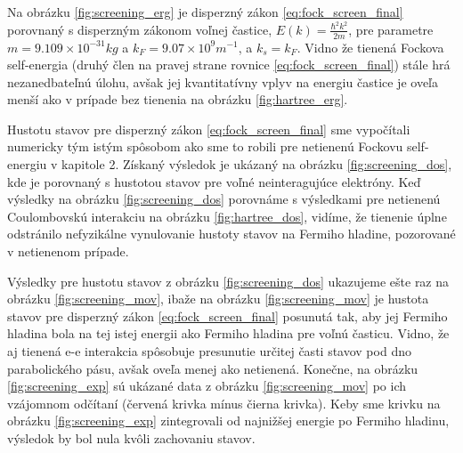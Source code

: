  Na obrázku \ref{fig:screening_erg} je disperzný zákon \eqref{eq:fock_screen_final} porovnaný s disperzným zákonom voľnej častice, $E(k)=\frac{\hbar^2 k^2}{2m}$, pre parametre $m = 9.109 \times 10^{-31} kg$ a $k_F = 9.07 \times 10^{9} m^{-1}$, a $k_s = k_F$. Vidno že tienená Fockova self-energia (druhý člen na pravej strane rovnice \ref{eq:fock_screen_final}) stále hrá nezanedbateľnú úlohu, avšak jej kvantitatívny vplyv na energiu častice je oveľa menší ako
 v prípade bez tienenia na obrázku \ref{fig:hartree_erg}.
 
 Hustotu stavov pre disperzný zákon \eqref{eq:fock_screen_final} sme vypočítali numericky tým istým spôsobom ako sme to robili pre netienenú Fockovu self-energiu v kapitole 2. Získaný výsledok je ukázaný na obrázku \ref{fig:screening_dos}, kde je porovnaný s hustotou stavov pre voľné neinteragujúce elektróny. Keď výsledky na obrázku \ref{fig:screening_dos} porovnáme s výsledkami pre netienenú Coulombovskú interakciu na obrázku  \ref{fig:hartree_dos}, vidíme, že tienenie úplne odstránilo nefyzikálne vynulovanie hustoty stavov na Fermiho hladine, pozorované v netienenom prípade. 
 

Výsledky pre hustotu stavov  z obrázku \ref{fig:screening_dos} ukazujeme ešte raz na obrázku \ref{fig:screening_mov}, ibaže na obrázku \ref{fig:screening_mov} je hustota stavov pre disperzný zákon \eqref{eq:fock_screen_final} posunutá tak, aby jej Fermiho hladina bola na tej istej energii ako Fermiho hladina pre voľnú časticu. Vidno, že aj tienená e-e interakcia spôsobuje presunutie určitej časti stavov
pod dno parabolického pásu, avšak oveľa menej ako netienená. Konečne, na obrázku \ref{fig:screening_exp} sú ukázané data z obrázku \ref{fig:screening_mov} po ich vzájomnom odčítaní (červená krivka mínus čierna krivka).
Keby sme krivku na obrázku \ref{fig:screening_exp}  zintegrovali od najnižšej energie po Fermiho hladinu, výsledok by bol nula kvôli zachovaniu stavov.

